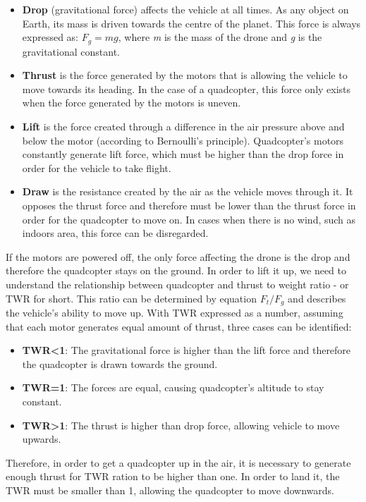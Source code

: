 \begin{itemize}
  \item \textbf{Drop} (gravitational force) affects the vehicle at all times. As any object on Earth, its mass is driven towards the centre of the planet. This force is always expressed as: $F_g = mg$, where \textit{m} is the mass of the drone and \textit{g} is the gravitational constant.
  \item \textbf{Thrust} is the force generated by the motors that is allowing the vehicle to move towards its heading. In the case of a quadcopter, this force only exists when the force generated by the motors is uneven.
  \item \textbf{Lift} is the force created through a difference in the air pressure above and below the motor (according to Bernoulli's principle). Quadcopter's motors constantly generate lift force, which must be higher than the drop force in order for the vehicle to take flight.
  \item \textbf{Draw} is the resistance created by the air as the vehicle moves through it. It opposes the thrust force and therefore must be lower than the thrust force in order for the quadcopter to move on. In cases when there is no wind, such as indoors area, this force can be disregarded.
\end{itemize} 

If the motors are powered off, the only force affecting the drone is the drop and therefore the quadcopter stays on the ground. In order to lift it up, we need to understand the relationship between quadcopter and thrust to weight ratio - or TWR for short. This ratio can be determined by equation $F_t/F_g$ and describes the vehicle's ability to move up. With TWR expressed as a number, assuming that each motor generates equal amount of thrust, three cases can be identified:

\begin{itemize}
\item \textbf{TWR<1}: The gravitational force is higher than the lift force and therefore the quadcopter is drawn towards the ground.
\item \textbf{TWR=1}: The forces are equal, causing quadcopter's altitude to stay constant.
\item \textbf{TWR>1}: The thrust is higher than drop force, allowing vehicle to move upwards.
\end{itemize}

Therefore, in order to get a quadcopter up in the air, it is necessary to generate enough thrust for TWR ration to be higher than one. In order to land it, the TWR must be smaller than 1, allowing the quadcopter to move downwards.

